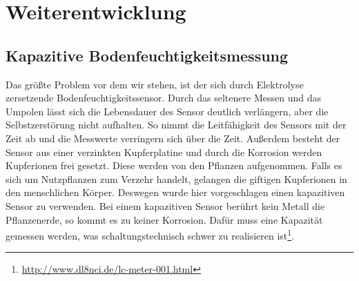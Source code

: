 
\section{Weiterentwicklung}


\subsection{Kapazitive Bodenfeuchtigkeitsmessung}
Das größte Problem vor dem wir stehen, ist der sich durch Elektrolyse zersetzende Bodenfeuchtigkeitssensor.
Durch das seltenere Messen und das Umpolen lässt sich die Lebensdauer des Sensor deutlich verlängern, aber die Selbstzerstörung nicht aufhalten.
So nimmt die Leitfähigkeit des Sensors mit der Zeit ab und die Messwerte verringern sich über die Zeit.
Außerdem besteht der Sensor aus einer verzinkten Kupferplatine und durch die Korrosion werden Kupferionen frei gesetzt. 
Diese werden von den Pflanzen aufgenommen. Falls es sich um Nutzpflanzen zum Verzehr handelt, gelangen die giftigen Kupferionen in den menschlichen Körper.
Deswegen wurde hier vorgeschlagen einen kapazitiven Sensor zu verwenden. 
Bei einem kapazitiven Sensor berührt kein Metall die Pflanzenerde, so kommt es zu keiner Korrosion.
Dafür muss eine Kapazität gemessen werden, was schaltungstechnisch schwer zu realisieren ist\footnote{\href{http://www.dl8nci.de/lc-meter-001.html}{http://www.dl8nci.de/lc-meter-001.html}}.
 